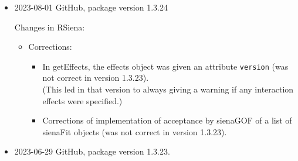 \documentclass[a4paper,fleqn,11pt]{article}
\newcommand{\+}{\, + \,}
\newcommand{\sfn}[1]{\textsf{#1}}
\begin{document}
\begin{small}
\begin{itemize}
\item 2023-08-01 GitHub, package version 1.3.24

Changes in RSiena:
\begin{itemize}
\item Corrections:
   \begin{itemize}
   \item In \sfn{getEffects}, the effects object was given an attribute
     \texttt{version} (was not correct in version 1.3.23).\\
    (This led in that version to always giving a warning if any interaction
    effects were specified.)
  \item Corrections of implementation of acceptance by \sfn{sienaGOF} of a list of
    \sfn{sienaFit} objects (was not correct in version 1.3.23).
    \end{itemize}
\end{itemize}

\item 2023-06-29 GitHub, package version 1.3.23.



\end{itemize}
\end{small}
\end{document}
